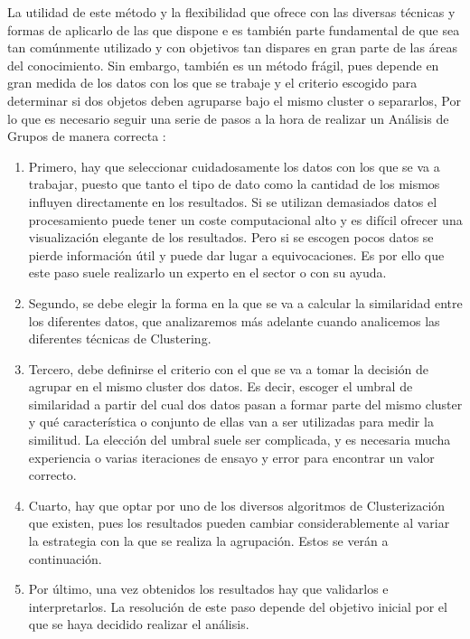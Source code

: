 \documentclass[3p,twocolumn]{elsarticle}
\begin{document}
La utilidad de este método y la flexibilidad que ofrece con las diversas técnicas y formas de aplicarlo de las que dispone e es también parte fundamental de que sea tan comúnmente utilizado y con objetivos tan dispares en gran parte de las áreas del conocimiento. Sin embargo, también es un método frágil, pues depende en gran medida de los datos con los que se trabaje y el criterio escogido para determinar si dos objetos deben agruparse bajo el mismo cluster o separarlos, Por lo que es necesario seguir una serie de pasos a la hora de realizar un Análisis de Grupos de manera correcta \cite{15}:

\begin{enumerate}
  \item Primero, hay que seleccionar cuidadosamente los datos con los que se va a trabajar, puesto que tanto el tipo de dato como la cantidad de los mismos influyen directamente en los resultados. Si se utilizan demasiados datos el procesamiento puede tener un coste computacional alto y es difícil ofrecer una visualización elegante de los resultados. Pero si se escogen pocos datos se pierde información útil y puede dar lugar a equivocaciones. Es por ello que este paso suele realizarlo un experto en el sector o con su ayuda. 
  \item Segundo, se debe elegir la forma en la que se va a calcular la similaridad entre los diferentes datos, que analizaremos más adelante cuando analicemos las diferentes técnicas de Clustering.
  \item Tercero, debe definirse el criterio con el que se va a tomar la decisión de agrupar en el mismo cluster dos datos. Es decir, escoger el umbral de similaridad a partir del cual dos datos pasan a formar parte del mismo cluster y qué característica o conjunto de ellas van a ser utilizadas para medir la similitud. La elección del umbral suele ser complicada, y es necesaria mucha experiencia o varias iteraciones de ensayo y error para encontrar un valor correcto.
  \item Cuarto, hay que optar por uno de los diversos algoritmos de Clusterización que existen, pues los resultados pueden cambiar considerablemente al variar la estrategia con la que se realiza la agrupación. Estos se verán a continuación.
  \item Por último, una vez obtenidos los resultados hay que validarlos e interpretarlos. La resolución de este paso depende del objetivo inicial por el que se haya decidido realizar el análisis.
\end{enumerate}
\end{document}
